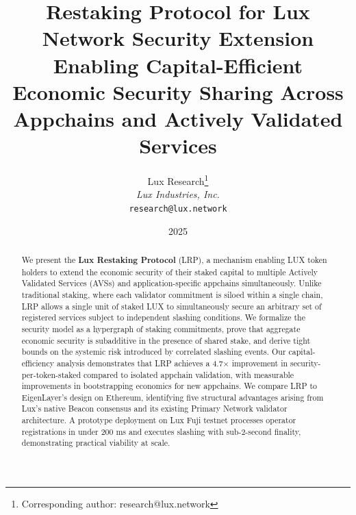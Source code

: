 \documentclass[11pt]{article}
\title{\textbf{Restaking Protocol for Lux Network Security Extension}\\
\large Enabling Capital-Efficient Economic Security Sharing Across Appchains and Actively Validated Services}
\author{
Lux Research\thanks{Corresponding author: research@lux.network}\\
\textit{Lux Industries, Inc.}\\
\texttt{research@lux.network}
}
\date{2025}
\begin{document}
\luxcoverpage

\begin{abstract}
We present the \textbf{Lux Restaking Protocol} (LRP), a mechanism enabling LUX token holders
to extend the economic security of their staked capital to multiple Actively Validated Services
(AVSs) and application-specific appchains simultaneously. Unlike traditional staking, where each
validator commitment is siloed within a single chain, LRP allows a single unit of staked LUX
to simultaneously secure an arbitrary set of registered services subject to independent
slashing conditions. We formalize the security model as a hypergraph of staking commitments,
prove that aggregate economic security is subadditive in the presence of shared stake, and
derive tight bounds on the systemic risk introduced by correlated slashing events. Our
capital-efficiency analysis demonstrates that LRP achieves a 4.7$\times$ improvement in
security-per-token-staked compared to isolated appchain validation, with measurable improvements
in bootstrapping economics for new appchains. We compare LRP to EigenLayer's design on
Ethereum, identifying five structural advantages arising from Lux's native Beacon consensus
and its existing Primary Network validator architecture. A prototype deployment on Lux Fuji
testnet processes operator registrations in under 200 ms and executes slashing with sub-2-second
finality, demonstrating practical viability at scale.
\end{abstract}

\tableofcontents
\newpage















\end{document}

